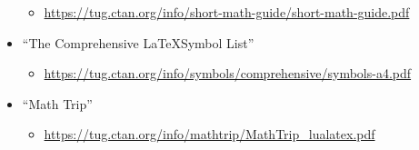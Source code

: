 \documentclass{article}
\begin{document}
\begin{itemize}
       \begin{itemize}
	\item \url{https://tug.ctan.org/info/short-math-guide/short-math-guide.pdf}
       \end{itemize}
  \item ``The Comprehensive \LaTeX Symbol List''
	\begin{itemize}
	 \item \url{https://tug.ctan.org/info/symbols/comprehensive/symbols-a4.pdf}
	\end{itemize}
  \item ``Math Trip''
	\begin{itemize}
	 \item \url{https://tug.ctan.org/info/mathtrip/MathTrip_lualatex.pdf}
	\end{itemize}
 \end{itemize}
\end{document}
